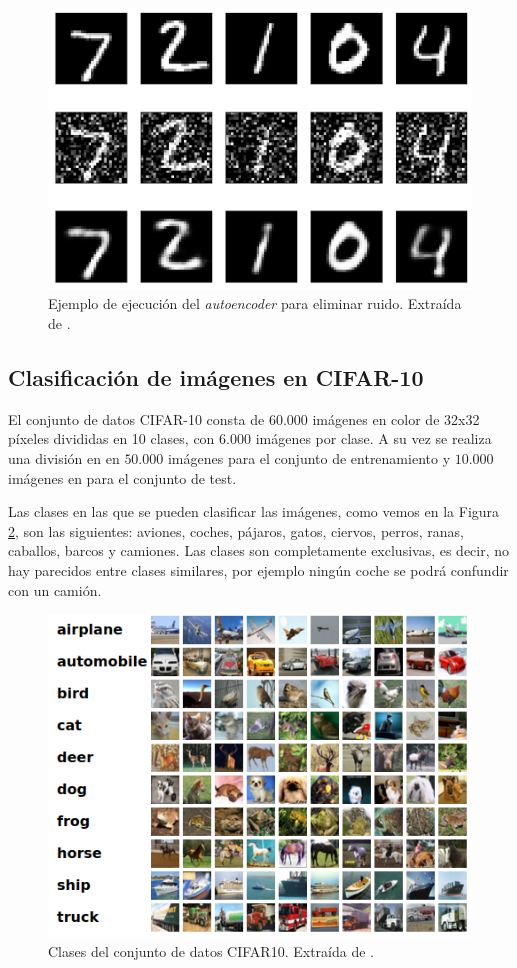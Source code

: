 \documentclass[
  a4paper,
  12pt,
  spanish,
]{scrartcl}
\theoremstyle{teorema-style}
\begin{document}
\begin{enumerate}
\begin{figure}[h]
  \centering
  \includegraphics[width=.7\textwidth]{img/autoencoder_ex2}
  \caption{Ejemplo de ejecución del \textit{autoencoder} para eliminar ruido. Extraída de \parencite{arden_autoencoder_2017}.}
  \label{fig:autoencoder_ex2}
\end{figure}

\subsection{Clasificación de imágenes en CIFAR-10}

El conjunto de datos CIFAR-10 \parencite{rizhevsky_learning_2009} consta de $60.000$ imágenes en color de 32x32 píxeles divididas en 10 clases, con $6.000$ imágenes por clase. A su vez se realiza una división en en $50.000$ imágenes para el conjunto de entrenamiento y $10.000$ imágenes en para el conjunto de test.

Las clases en las que se pueden clasificar las imágenes, como vemos en la Figura \ref{fig:cifar10}, son las siguientes: aviones, coches, pájaros, gatos, ciervos, perros, ranas, caballos, barcos y camiones. Las clases son completamente exclusivas, es decir, no hay parecidos entre clases similares, por ejemplo ningún coche se podrá confundir con un camión.

\begin{figure}[h]
  \centering
  \includegraphics[width=.7\textwidth]{img/cifar10}
  \caption{Clases del conjunto de datos CIFAR10. Extraída de \parencite{rizhevsky_cifar_2013}.}
  \label{fig:cifar10}
\end{figure}


\end{enumerate}
\end{document}
